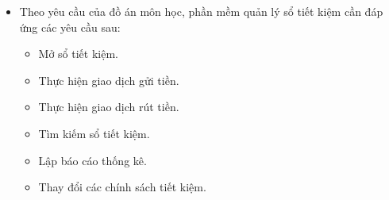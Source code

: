 \documentclass{article}
\begin{document}
		\begin{itemize}
			\item Theo yêu cầu của đồ án môn học, phần mềm quản lý sổ tiết kiệm cần đáp ứng các yêu cầu sau:
			\begin{itemize}
				\item Mở sổ tiết kiệm.
				\item Thực hiện giao dịch gửi tiền.
				\item Thực hiện giao dịch rút tiền.
				\item Tìm kiếm sổ tiết kiệm.
				\item Lập báo cáo thống kê.
				\item Thay đổi các chính sách tiết kiệm.
			\end{itemize}		
		\end{itemize}
		
\end{document}
